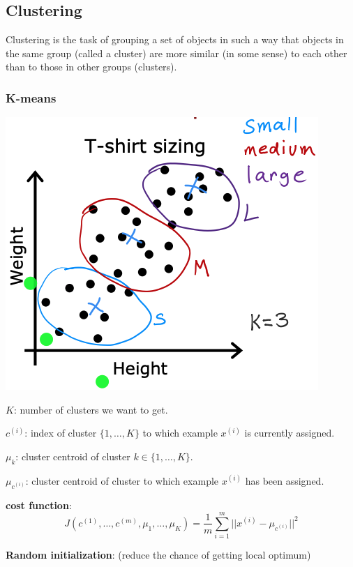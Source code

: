 \documentclass{article}
\begin{document}
\subsection{Clustering}

\noindent Clustering is the task of grouping a set of objects in such a way that objects in the same group (called a cluster) are more similar (in some sense) to each other than to those in other groups (clusters).

\subsubsection{K-means}

\begin{center}
\includegraphics[scale=0.5]{./images/k_means_clustering.png}
\end{center}

\noindent \(K\): number of clusters we want to get.

\noindent \(c^{(i)}\): index of cluster \(\{1, \dots, K\}\) to which example \(x^{(i)}\) is currently assigned.

\noindent \(\mu_{k}\): cluster centroid of cluster \(k \in \{1, \dots, K\}\).

\noindent \(\mu_{c^{(i)}}\): cluster centroid of cluster to which example \(x^{(i)}\) has been assigned.

\noindent \textbf{cost function}:
\[J(c^{(1)}, \dots, c^{(m)}, \mu_{1}, \dots, \mu_{K}) = \frac{1}{m} \sum_{i = 1}^m  \vert\vert x^{(i)} - \mu_{c^{(i)}} \vert\vert^2\]

\noindent \textbf{Random initialization}: (reduce the chance of getting local optimum)
\end{document}
